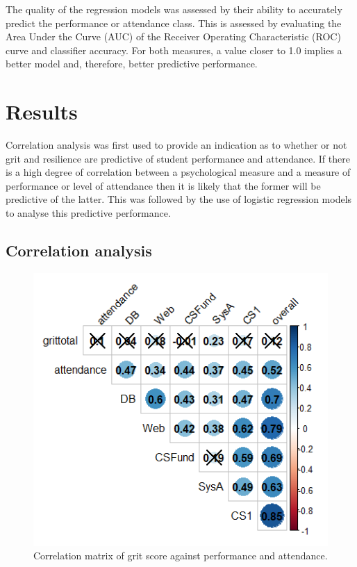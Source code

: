 \documentclass[sigconf]{acmart}
\begin{document}
The quality of the regression models was assessed by their ability to accurately predict the performance or attendance class. This is assessed by evaluating the Area Under the Curve (AUC) of the Receiver Operating Characteristic (ROC) curve and classifier accuracy. For both measures, a value closer to 1.0 implies a better model and, therefore, better predictive performance. 

\section {Results}
Correlation analysis was first used to provide an indication as to whether or not grit and resilience are predictive of student performance and attendance. If there is a high degree of correlation between a psychological measure and a measure of performance or level of attendance then it is likely that the former will be predictive of the latter. This was followed by the use of logistic regression models to analyse this predictive performance.

\subsection{Correlation analysis}

\begin{figure} [h]
\centering
\includegraphics[width=.98\linewidth]{images/cor_plot_grit.png}
\caption{Correlation matrix of grit score against performance and attendance.}
\label{fig:cor_grit} 
\end{figure}
\end{document}

